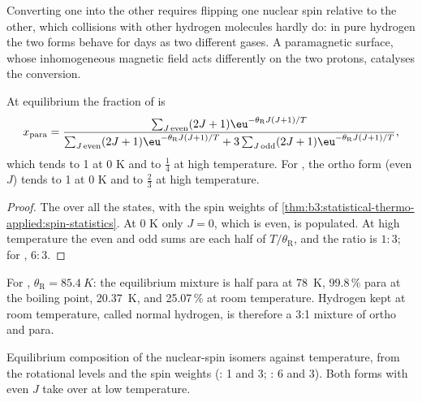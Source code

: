 Converting one into the other requires flipping one nuclear spin relative to
the other, which collisions with other hydrogen molecules hardly do: in pure
hydrogen the two forms behave for days as two different gases. A paramagnetic
surface, whose inhomogeneous magnetic field acts differently on the two
protons, catalyses the conversion.

\begin{proposition}\label{prop:b3:statistical-thermo-applied:ortho-para}
At equilibrium the fraction of  is
\[
  x_{\mathrm{para}} = \frac{\sum_{J\,\mathrm{even}}(2J+1)\eu^{-\theta_{\mathrm R}J(J+1)/T}}
    {\sum_{J\,\mathrm{even}}(2J+1)\eu^{-\theta_{\mathrm R}J(J+1)/T} + 3\sum_{J\,\mathrm{odd}}(2J+1)\eu^{-\theta_{\mathrm R}J(J+1)/T}},
\]
which tends to 1 at 0 K and to $\frac14$ at high temperature. For , the ortho form
(even $J$) tends to 1 at 0 K and to $\frac23$ at high temperature.
\end{proposition}

\begin{proof}
The  over all the states, with the spin weights of
\cref{thm:b3:statistical-thermo-applied:spin-statistics}. At 0 K only $J = 0$, which is
even, is populated. At high temperature the even and odd sums are each half
of $T/\theta_{\mathrm R}$, and the ratio is $1 : 3$; for , $6 : 3$.
\end{proof}

For , $\theta_{\mathrm R} = \qty{85.4}{K}$: the equilibrium mixture is half para at \qty{78}{K},
99.8\,\% para at the boiling point, \qty{20.37}{K}, and 25.07\,\% at room
temperature. Hydrogen kept at room temperature, called normal hydrogen, is
therefore a 3:1 mixture of ortho and para.

\begin{omfigure}

{\small Equilibrium composition of the nuclear-spin isomers against
temperature, from the rotational levels and the spin weights (: 1 and 3;
: 6 and 3). Both forms with even $J$ take over at low temperature.}
\end{omfigure}

